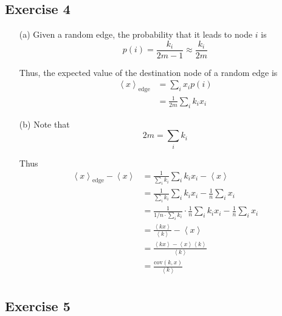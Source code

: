 \documentclass{article}
\newcommand{\cov}{\mathrm{cov}}
\newcommand{\angles}[1]{\left \langle #1 \right \rangle}
\begin{document}
\newpage

\subsection*{Exercise 4}

\begin{enumerate}
  \item[(a)]
  Given a random edge, the probability that it leads to node \( i \) is
  \[ p(i) = \frac{k_i}{2m - 1} \approx \frac{k_i}{2m} \]

  Thus, the expected value of the destination node of a random edge is
  \begin{align*}
    \angles{x}_{\text{edge}} &= \sum_i x_i p(i) \\
    &= \frac{1}{2m} \sum_i k_i x_i
  \end{align*}

  \item[(b)]
  Note that
  \[ 2m = \sum_i k_i \]

  Thus
  \begin{align*}
    \angles{x}_{\text{edge}} - \angles{x} &= \frac{1}{\sum_i k_i} \sum_i k_i x_i - \angles{x} \\
    &= \frac{1}{\sum_i k_i} \sum_i k_i x_i - \frac{1}{n} \sum_i x_i \\
    &= \frac{1}{1 / n \cdot \sum_i k_i} \cdot \frac{1}{n} \sum_i k_i x_i - \frac{1}{n} \sum_i x_i \\
    &= \frac{\angles{kx}}{\angles{k}} - \angles{x} \\
    &= \frac{\angles{kx} - \angles{x} \angles{k}}{\angles{k}} \\
    &= \frac{\cov(k, x)}{\angles{k}} \\
  \end{align*}
\end{enumerate}

\newpage

\subsection*{Exercise 5}
\end{document}
